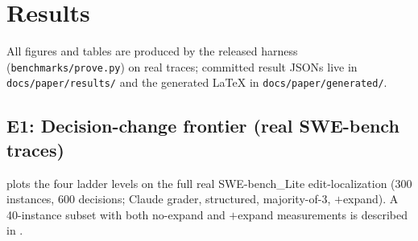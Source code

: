 \documentclass[11pt]{article}
\begin{document}
\section{Results}
\label{sec:results}
{\sloppy
All figures and tables are produced by the released harness
(\texttt{benchmarks/prove.py}) on real traces; committed result JSONs live in
\texttt{docs/paper/results/} and the generated LaTeX in
\texttt{docs/paper/generated/}.\par}

\subsection{E1: Decision-change frontier (real SWE-bench traces)}

 plots the four ladder levels on the full real SWE-bench\_Lite
edit-localization (300 instances, 600 decisions; Claude grader, structured,
majority-of-3, $+$expand). A 40-instance subset with both no-expand and $+$expand
measurements is described in .
\end{document}
